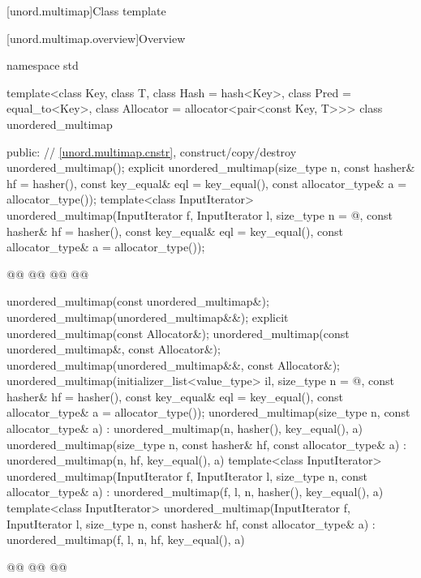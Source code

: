 \documentclass{wg21}
\begin{document}
[unord.multimap]{Class template }%

[unord.multimap.overview]{Overview}

%
\begin{codeblock}
namespace std {
template<class Key,
class T,
class Hash = hash<Key>,
class Pred = equal_to<Key>,
class Allocator = allocator<pair<const Key, T>>>
class unordered_multimap {
    public:
    // \ref{unord.multimap.cnstr}, construct/copy/destroy
    unordered_multimap();
    explicit unordered_multimap(size_type n,
    const hasher& hf = hasher(),
    const key_equal& eql = key_equal(),
    const allocator_type& a = allocator_type());
    template<class InputIterator>
    unordered_multimap(InputIterator f, InputIterator l,
        size_type n = @\seebelow@,
        const hasher& hf = hasher(),
        const key_equal& eql = key_equal(),
        const allocator_type& a = allocator_type());

    @@
    @@
    @@
    @@

    unordered_multimap(const unordered_multimap&);
    unordered_multimap(unordered_multimap&&);
    explicit unordered_multimap(const Allocator&);
    unordered_multimap(const unordered_multimap&, const Allocator&);
    unordered_multimap(unordered_multimap&&, const Allocator&);
    unordered_multimap(initializer_list<value_type> il,
    size_type n = @\seebelow@,
    const hasher& hf = hasher(),
    const key_equal& eql = key_equal(),
    const allocator_type& a = allocator_type());
    unordered_multimap(size_type n, const allocator_type& a)
    : unordered_multimap(n, hasher(), key_equal(), a) { }
    unordered_multimap(size_type n, const hasher& hf, const allocator_type& a)
    : unordered_multimap(n, hf, key_equal(), a) { }
    template<class InputIterator>
    unordered_multimap(InputIterator f, InputIterator l, size_type n, const allocator_type& a)
    : unordered_multimap(f, l, n, hasher(), key_equal(), a) { }
    template<class InputIterator>
    unordered_multimap(InputIterator f, InputIterator l, size_type n, const hasher& hf,
    const allocator_type& a)
    : unordered_multimap(f, l, n, hf, key_equal(), a) { }

    @@
    @@
    @@

}}
\end{codeblock}
\end{document}
